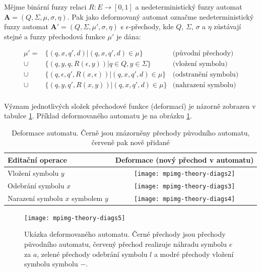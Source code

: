 \documentclass[a4paper,10pt]{article}
\begin{document}
\begin{definition} \label{def-AutRozpCalL}
 Mějme binární fuzzy relaci $R: E \rightarrow [0, 1]$ a nedeterministický fuzzy automat $\mathbf{A} = (Q, \Sigma, \mu, \sigma, \eta)$. Pak jako deformovaný automat označme nedeterministický fuzzy automat $\mathbf{A}' = (Q, \Sigma, \mu', \sigma, \eta)$ s $\epsilon$-přechody, kde $Q$, $\Sigma$, $\sigma$ a $\eta$ zůstávají stejné a fuzzy přechodová funkce $\mu'$ je dána:
 
 \begin{align*}
  \mu' = 	& \{ (q, x, q', d) | (q, x, q', d) \in \mu \} 			& \text{(původní přechody)}	\\
    \cup 	& \{ (q, y, q, R(\epsilon, y)) | q \in Q, y \in \Sigma \} 	& \text{(vložení symbolu)}	\\
    \cup 	& \{ (q, \epsilon, q', R(x, \epsilon)) | (q, x, q', d) \in \mu \} & \text{(odstranění symbolu)}	\\
    \cup 	& \{ (q, y, q', R(x, y)) | (q, x, q', d) \in \mu \} 		& \text{(nahrazení symbolu)} \\
  \end{align*}
\end{definition}

Význam jednotlivých složek přechodové funkce (deformací) je názorně zobrazen v tabulce \ref{tbl:DefAutDef}. Příklad deformovaného automatu je na obrázku \ref{img:DefAut}. 

\begin{table}
 \begin{tabular}{|l|c|}
  \hline
  Editační operace 			& Deformace (nový přechod v automatu)	 \\
  \hline
  Vložení symbolu $y$ 			& \texttt{[image: mpimg-theory-diags2]} \\
  \hline
  Odebrání symbolu $x$ 			& \texttt{[image: mpimg-theory-diags3]} \\
  \hline
  Narazení symbolu $x$ symbolem $y$ 	& \texttt{[image: mpimg-theory-diags4]} \\
  \hline
 \end{tabular}
 \caption{Deformace automatu. Černě jsou znázorněny přechody původního automatu, červeně pak nově přidané}\label{tbl:DefAutDef}
\end{table}

\begin{figure}
  \texttt{[image: mpimg-theory-diags5]}
  \caption[Ukázka deformovaného automatu]{Ukázka deformovaného automatu. Černé přechody jsou přechody původního automatu, červený přechod realizuje náhradu symbolu $e$ za $a$, zelené přechody odebrání symbolu $l$ a modré přechody vložení symbolu symbolu $-$.} \label{img:DefAut}
\end{figure}
 
\end{document}
